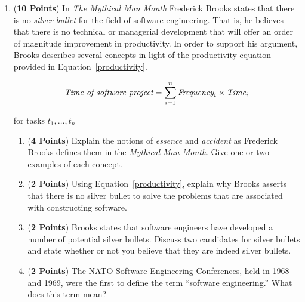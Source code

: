 \documentclass[12pt,epsf,psfig,graphics]{article}
\begin{document}
\begin{enumerate}
  
\item ({\bf 10 Points}) In {\em The Mythical Man Month} Frederick
  Brooks states that there is no {\em silver bullet} for the field of
  software engineering.  That is, he believes that there is no
  technical or managerial development that will offer an order of
  magnitude improvement in productivity. In order to support his
  argument, Brooks describes several concepts in light of the
  productivity equation provided in Equation~\ref{productivity}.

        \begin{equation} \label{productivity}
        \mbox{{\em Time of software project}} = \sum_{i = 1}^{n} 
                \mbox{{\em Frequency}}_i \times \mbox{{\em Time}}_i
        \end{equation}

        \begin{center}
          for tasks $t_1, \ldots, t_n$
        \end{center}

        \begin{enumerate}
          
        \item ({\bf 4 Points}) Explain the notions of {\em essence}
          and {\em accident} as Frederick Brooks defines them in the
          {\em Mythical Man Month}.  Give one or two examples of each
          concept.
          
        \item ({\bf 2 Points}) Using Equation~\ref{productivity},
          explain why Brooks asserts that there is no silver bullet to
          solve the problems that are associated with constructing
          software.
        
        \item ({\bf 2 Points}) Brooks states that software engineers
          have developed a number of potential silver bullets.
          Discuss two candidates for silver bullets and state whether
          or not you believe that they are indeed silver bullets.

        \item ({\bf 2 Points}) The NATO Software Engineering
          Conferences, held in 1968 and 1969, were the first to define
          the term ``software engineering.''  What does this term
          mean?

       \end{enumerate}
        

\end{enumerate}
\end{document}
